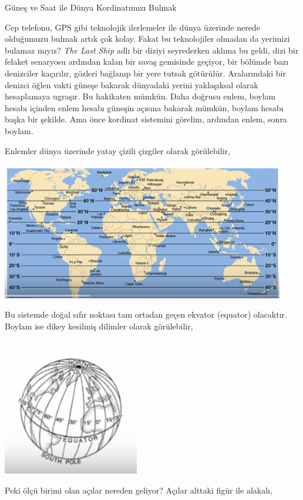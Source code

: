 \documentclass[12pt,fleqn]{article}\usepackage{../../common}
\begin{document}
Güneş ve Saat ile Dünya Kordinatımızı Bulmak

Cep telefonu, GPS gibi teknolojik ilerlemeler ile dünya üzerinde nerede
olduğumuzu bulmak artık çok kolay. Fakat bu teknolojiler olmadan da yerimizi
bulamaz mıyız? {\em The Last Ship} adlı bir diziyi seyrederken aklıma bu geldi,
dizi bir felaket senaryosu ardından kalan bir savaş gemisinde geçiyor, bir
bölümde bazı denizciler kaçırılır, gözleri bağlanıp bir yere tutsak
götürülür. Aralarındaki bir denizci öğlen vakti güneşe bakarak dünyadaki yerini
yaklaşıksal olarak hesaplamaya ugraşır. Bu hakikaten mümkün. Daha doğrusu enlem,
boylam hesabı içinden enlem hesabı güneşin açısına bakarak mümkün, boylam hesabı
başka bir şekilde. Ama önce kordinat sistemini görelim, ardından enlem, sonra
boylam.

Enlemler dünya üzerinde yatay çizili çizgiler olarak görülebilir,

\includegraphics[height=6cm]{geo_04.png}

Bu sistemde doğal sıfır noktası tam ortadan geçen ekvator (equator)
olacaktır. Boylam ise dikey kesilmiş dilimler olarak görülebilir,

\includegraphics[height=6cm]{geo_02.png}

Peki ölçü birimi olan açılar nereden geliyor? Açılar alttaki figür ile alakalı,
\end{document}
